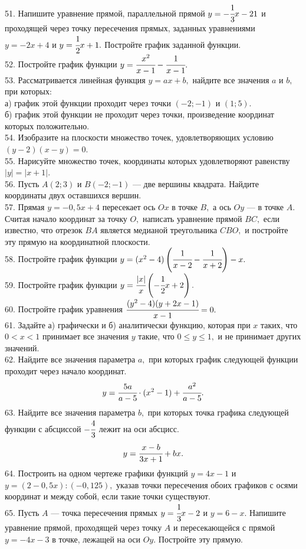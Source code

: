 \documentclass[12pt]{article}
\begin{document}
51. Напишите уравнение прямой, параллельной прямой $y=-\cfrac{1}{3}x-21$  и проходящей через точку пересечения прямых, заданных уравнениями $y=-2x+4$ и $y=\cfrac{1}{2}x+1.$ Постройте график заданной функции.\\
52. Постройте график функции $y=\cfrac{x^2}{x-1}-\cfrac{1}{x-1}.$\\
53. Рассматривается линейная функция $y=ax+b,$ найдите все значения $a$ и $b,$ при которых:\\
а) график этой функции проходит через точки $(-2;-1)$ и $(1;5).$\\
б) график этой функции не проходит через точки, произведение координат которых положительно.\\
54. Изобразите на плоскости множество точек, удовлетворяющих условию $(y-2)(x-y)=0.$\\
55. Нарисуйте множество точек, координаты которых удовлетворяют равенству $|y|=|x+1|.$\\
56. Пусть $A(2;3)$ и $B(-2;-1)$ --- две вершины квадрата. Найдите координаты двух оставшихся вершин.\\
57. Прямая $y=-0,5x+4$ пересекает ось $Ox$ в точке $B,$ а ось $Oy$ --- в точке $A.$ Считая начало координат за точку $O,$ написать уравнение прямой $BC,$ если известно, что отрезок $BA$ является медианой треугольника $CBO,$ и постройте эту прямую на координатной плоскости.\\
58. Постройте график функции $y=(x^2-4)\left(\cfrac{1}{x-2}-\cfrac{1}{x+2}\right)-x.$\\
59. Постройте график функции $y=\cfrac{|x|}{x}\left(-\cfrac{1}{2}x+2\right).$\\
60. Постройте график уравнения $\cfrac{(y^2-4)(y+2x-1)}{x-1}=0.$\\
61. Задайте а) графически и б) аналитически функцию, которая при $x$ таких, что $0<x<1$ принимает все значения $y$ такие, что $0\le y\le1,$ и не принимает других значений.\\
62. Найдите все значения параметра $a,$ при которых график следующей функции проходит через начало координат.
$$y=\cfrac{5a}{a-5}\cdot(x^2-1)+\cfrac{a^2}{a-5}.$$
63. Найдите все значения параметра $b,$ при которых точка графика следующей функции с абсциссой $-\cfrac{4}{3}$ лежит на оси абсцисс.
$$y=\cfrac{x-b}{3x+1}+bx.$$
64. Построить на одном чертеже графики функций $y=4x-1$ и $y=(2-0,5x): (-0,125),$
указав точки пересечения обоих графиков с осями координат и между собой, если такие точки существуют.\\
65. Пусть $A$ --- точка пересечения прямых $y=\cfrac{1}{3}x-2$ и $y=6-x.$ Напишите уравнение прямой, проходящей через точку $A$ и пересекающейся с прямой $y=-4x-3$ в точке, лежащей на оси $Oy.$ Постройте эту прямую.\\
\end{document}
